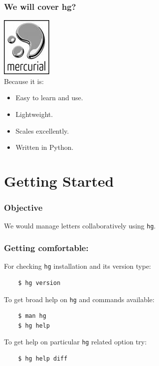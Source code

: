 \documentclass[14pt,compress]{beamer}
\newcounter{time}
\newcommand{\inctime}[1]{\addtocounter{time}{#1}{\tiny \thetime\ m}}
\newcommand{\typ}[1]{\lstinline{#1}}
\begin{document}
\begin{frame}
  \frametitle{We will cover hg?}
    \includegraphics[height=.75in, interpolate=true]{mercurial}\\
  Because it is:
  \begin{itemize}
  \item Easy to learn and use.
  \item Lightweight.
  \item Scales excellently.
  \item Written in Python.
  \end{itemize}
  \inctime{15}
\end{frame}

\section{Getting Started}

\begin{frame}
  \frametitle{Objective}
  \begin{block}{}
    We would \alert{manage} letters collaboratively using \typ{hg}.
  \end{block}

\end{frame}

\begin{frame}[fragile]
  \frametitle{Getting comfortable:}
  For checking \typ{hg} installation and its version type:
  \begin{lstlisting}
    $ hg version    
  \end{lstlisting}
  To get broad help on \typ{hg} and commands available:
  \begin{lstlisting}
    $ man hg
    $ hg help
  \end{lstlisting}
  To get help on particular \typ{hg} related option try:
  \begin{lstlisting}
    $ hg help diff
  \end{lstlisting} %
\end{frame}
\end{document}
